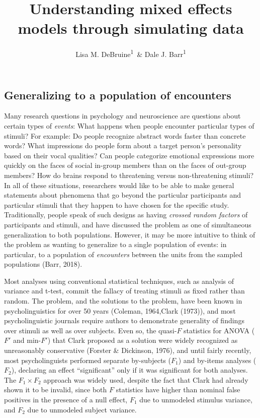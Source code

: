 \documentclass[man,floatsintext]{apa6}
\title{Understanding mixed effects models through simulating data}
\author{Lisa M. DeBruine\textsuperscript{1}~\& Dale J. Barr\textsuperscript{1}}
\date{}
\affiliation{
\vspace{0.5cm}
\textsuperscript{1} Institute of Neuroscience and Psychology, University of Glasgow}
\begin{document}
\maketitle

\subsection{Generalizing to a population of
encounters}\label{generalizing-to-a-population-of-encounters}

Many research questions in psychology and neuroscience are questions
about certain types of \emph{events}: What happens when people encounter
particular types of stimuli? For example: Do people recognize abstract
words faster than concrete words? What impressions do people form about
a target person's personality based on their vocal qualities? Can people
categorize emotional expressions more quickly on the faces of social
in-group members than on the faces of out-group members? How do brains
respond to threatening versus non-threatening stimuli? In all of these
situations, researchers would like to be able to make general statements
about phenomena that go beyond the particular participants and
particular stimuli that they happen to have chosen for the specific
study. Traditionally, people speak of such designs as having
\emph{crossed random factors} of participants and stimuli, and have
discussed the problem as one of simultaneous generalization to both
populations. However, it may be more intuitive to think of the problem
as wanting to generalize to a single population of events: in
particular, to a population of \emph{encounters} between the units from
the sampled populations (Barr, 2018).

Most analyses using conventional statistical techniques, such as
analysis of variance and t-test, commit the fallacy of treating stimuli
as fixed rather than random. The problem, and the solutions to the
problem, have been known in psycholinguistics for over 50 years
(Coleman, 1964,Clark (1973)), and most psycholinguistic journals require
authors to demonstrate generality of findings over stimuli as well as
over subjects. Even so, the quasi-\(F\) statistics for ANOVA (\(F'\) and
min-\(F'\)) that Clark proposed as a solution were widely recognized as
unreasonably conservative (Forster \& Dickinson, 1976), and until fairly
recently, most psycholinguists performed separate by-subjects (\(F_1\))
and by-items analyses (\(F_2\)), declaring an effect
\enquote{significant} only if it was significant for both analyses. The
\(F_1 \times F_2\) approach was widely used, despite the fact that Clark
had already shown it to be invalid, since both \(F\) statistics have
higher than nominal false positives in the presence of a null effect,
\(F_1\) due to unmodeled stimulus variance, and \(F_2\) due to unmodeled
subject variance.
\end{document}
